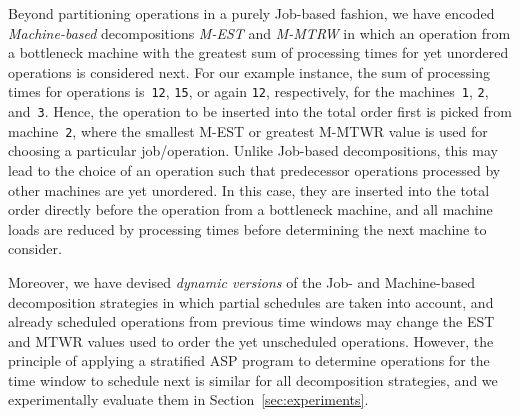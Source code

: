 \documentclass{tlp} %
\begin{document}
Beyond partitioning operations in a purely Job-based fashion,
we have encoded \emph{Machine-based} decompositions \emph{M-EST} and \emph{M-MTRW} in which an operation from a bottleneck machine with the greatest sum of processing times for yet unordered operations is considered next.
For our example instance, the sum of processing times for operations 
is~\lstinline{12}, \lstinline{15}, or again \lstinline{12}, respectively,
for the machines~\lstinline{1}, \lstinline{2}, and~\lstinline{3}.
Hence, the operation to be inserted into the total order first is picked from
machine~\lstinline{2}, where the smallest M-EST or greatest M-MTWR value is
used for choosing a particular job/operation.
Unlike Job-based decompositions, this may lead to the choice of an operation
such that predecessor operations processed by other machines are yet unordered.
In this case, they are inserted into the total order directly before the
operation from a bottleneck machine, and all machine loads are reduced by processing times before determining the next machine to consider.

Moreover, we have devised \emph{dynamic versions} of the Job- and Machine-based 
decomposition strategies in which partial schedules are taken into account,
and already scheduled operations from previous time windows may change the EST and MTWR values used to order the yet unscheduled operations.
However, the principle of applying a stratified ASP program to determine
operations for the time window to schedule next is similar for all decomposition
strategies, and we experimentally evaluate them in Section~\ref{sec:experiments}.

\end{document}
